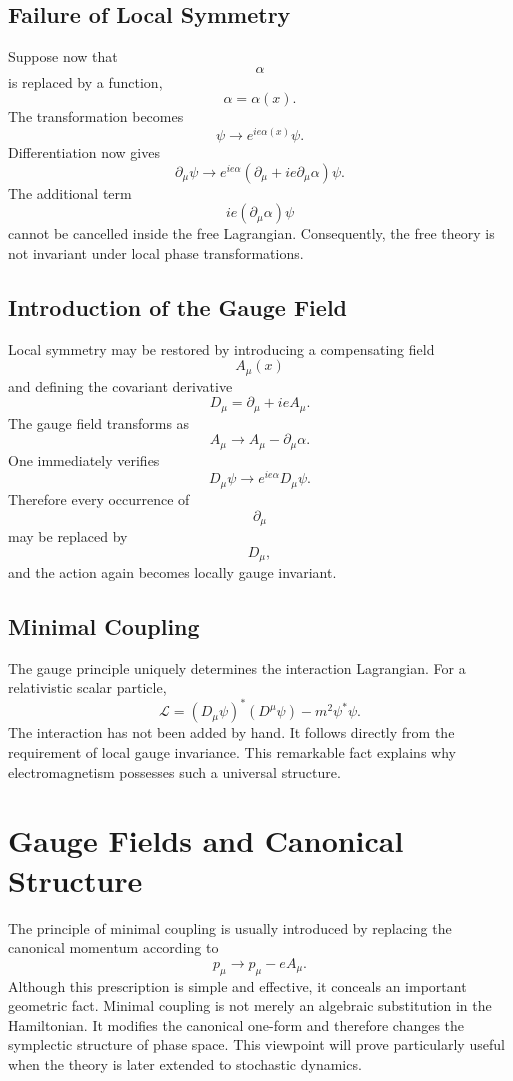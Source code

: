 \subsection{Failure of Local Symmetry}
Suppose now that
\[\alpha\]
is replaced by a function,
\[\alpha=\alpha(x).\]
The transformation becomes
\[\boxed{\psi\rightarrow e^{ie\alpha(x)}\psi.}\]
Differentiation now gives
\[\partial_\mu\psi\rightarrow e^{ie\alpha}\left(\partial_\mu+
ie\partial_\mu\alpha \right)\psi.\]
The additional term
\[ie(\partial_\mu\alpha)\psi\]
cannot be cancelled inside the free Lagrangian.
Consequently,
the free theory is not invariant under local phase transformations.
\subsection{Introduction of the Gauge Field}
Local symmetry may be restored by introducing a compensating field
\[A_\mu(x)\]
and defining the covariant derivative
\[\boxed{D_\mu=\partial_\mu+ieA_\mu.}\]
The gauge field transforms as
\[\boxed{A_\mu\rightarrow A_\mu-\partial_\mu\alpha.}\]
One immediately verifies
\[D_\mu\psi\rightarrow e^{ie\alpha}D_\mu\psi.\]
Therefore every occurrence of
\[\partial_\mu\]
may be replaced by
\[D_\mu,\]
and the action again becomes locally gauge invariant.
\subsection{Minimal Coupling}
The gauge principle uniquely determines the interaction Lagrangian.
For a relativistic scalar particle,
\[\boxed{\mathcal L=(D_\mu\psi)^*(D^\mu\psi)-m^2\psi^*\psi.}\]
The interaction has not been added by hand.
It follows directly from the requirement of local gauge invariance.
This remarkable fact explains why electromagnetism possesses such a
universal structure.
\section{Gauge Fields and Canonical Structure}
The principle of minimal coupling is usually introduced by replacing the
canonical momentum according to
\[p_\mu\longrightarrow p_\mu-eA_\mu.\]
Although this prescription is simple and effective, it conceals an
important geometric fact.
Minimal coupling is not merely an algebraic substitution in the
Hamiltonian. It modifies the canonical one-form and therefore changes
the symplectic structure of phase space.
This viewpoint will prove particularly useful when the theory is later
extended to stochastic dynamics.
